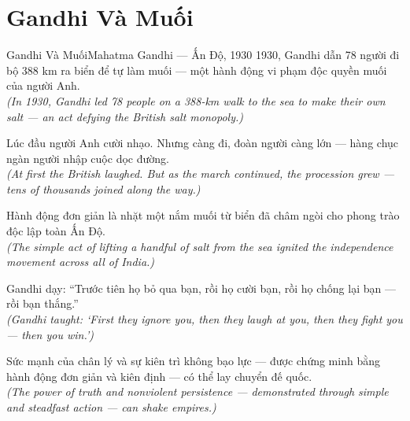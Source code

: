\section{Gandhi Và Muối}
\begin{truyen}{Gandhi Và Muối}{Mahatma Gandhi --- Ấn Độ, 1930}
 1930, Gandhi dẫn 78 người đi bộ 388 km ra biển để tự làm muối --- một hành động vi phạm độc quyền muối của người Anh.\\[4pt]
\textit{(In 1930, Gandhi led 78 people on a 388-km walk to the sea to make their own salt --- an act defying the British salt monopoly.)}

Lúc đầu người Anh cười nhạo. Nhưng càng đi, đoàn người càng lớn --- hàng chục ngàn người nhập cuộc dọc đường.\\[4pt]
\textit{(At first the British laughed. But as the march continued, the procession grew --- tens of thousands joined along the way.)}

Hành động đơn giản là nhặt một nắm muối từ biển đã châm ngòi cho phong trào độc lập toàn Ấn Độ.\\[4pt]
\textit{(The simple act of lifting a handful of salt from the sea ignited the independence movement across all of India.)}

Gandhi dạy: ``Trước tiên họ bỏ qua bạn, rồi họ cười bạn, rồi họ chống lại bạn --- rồi bạn thắng.''\\[4pt]
\textit{(Gandhi taught: `First they ignore you, then they laugh at you, then they fight you --- then you win.')}

\end{truyen}
\begin{baihoc}
  Sức mạnh của chân lý và sự kiên trì không bạo lực --- được chứng minh bằng hành động đơn giản và kiên định --- có thể lay chuyển đế quốc.\\[4pt]
  \textit{(The power of truth and nonviolent persistence --- demonstrated through simple and steadfast action --- can shake empires.)}
\end{baihoc}
